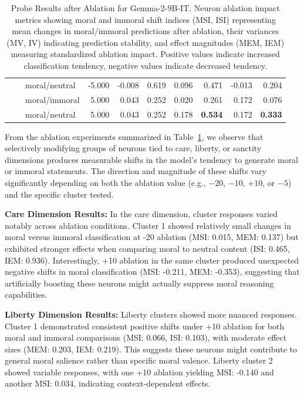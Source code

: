 \documentclass[runninghheads]{llncs}
\begin{document}
\begin{table}[!ht]
\begin{tabular}{|l|l|l|r|r|r|r|r|r|r|}
         &  & moral/neutral & -5.000 & -0.008 & 0.619 & 0.096 & 0.471 & -0.013 & 0.204 \\ 
         &  & moral/immoral & 5.000 & 0.043 & 0.252 & 0.020 & 0.261 & 0.172 & 0.076 \\ 
         &  & moral/neutral & 5.000 & 0.043 & 0.252 & 0.178 & \textbf{0.534} & 0.172 & \textbf{0.333} \\ 
         \hline
    \end{tabular}
    \endgroup
        \caption{Probe Results after Ablation for Gemma-2-9B-IT. Neuron ablation impact metrics showing moral and immoral shift indices (MSI, ISI) representing mean changes in moral/immoral predictions after ablation, their variances (MV, IV) indicating prediction stability, and effect magnitudes (MEM, IEM) measuring standardized ablation impact. Positive values indicate increased classification tendency, negative values indicate decreased tendency.}
    \label{tab:probe_results}    
\end{table}




From the ablation experiments summarized in Table~\ref{tab:probe_results}, we observe that selectively modifying groups of neurons tied to care, liberty, or sanctity dimensions produces measurable shifts in the model's tendency to generate moral or immoral statements. The direction and magnitude of these shifts vary significantly depending on both the ablation value (e.g., $-20$, $-10$, $+10$, or $-5$) and the specific cluster tested.

\textbf{Care Dimension Results:} In the care dimension, cluster responses varied notably across ablation conditions. Cluster 1 showed relatively small changes in moral versus immoral classification at -20 ablation (MSI: 0.015, MEM: 0.137) but exhibited stronger effects when comparing moral to neutral content (ISI: 0.465, IEM: 0.936). Interestingly, +10 ablation in the same cluster produced unexpected negative shifts in moral classification (MSI: -0.211, MEM: -0.353), suggesting that artificially boosting these neurons might actually suppress moral reasoning capabilities.

\textbf{Liberty Dimension Results:} Liberty clusters showed more nuanced responses. Cluster 1 demonstrated consistent positive shifts under +10 ablation for both moral and immoral comparisons (MSI: 0.066, ISI: 0.103), with moderate effect sizes (MEM: 0.203, IEM: 0.219). This suggests these neurons might contribute to general moral salience rather than specific moral valence. Liberty cluster 2 showed variable responses, with one +10 ablation yielding MSI: -0.140 and another MSI: 0.034, indicating context-dependent effects.
\end{document}
